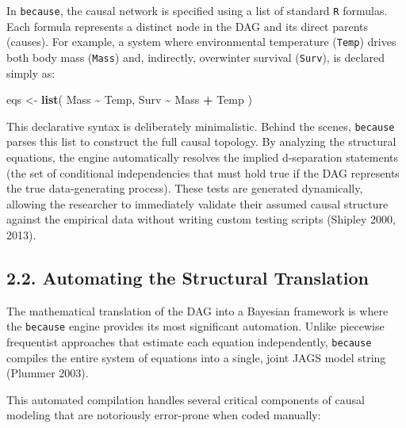 \documentclass[
]{article}
\newenvironment{Shaded}{\begin{snugshade}}{\end{snugshade}}
\newcommand{\FunctionTok}[1]{\textcolor[rgb]{0.13,0.29,0.53}{\textbf{#1}}}
\newcommand{\NormalTok}[1]{#1}
\newcommand{\OtherTok}[1]{\textcolor[rgb]{0.56,0.35,0.01}{#1}}
\newcommand{\SpecialCharTok}[1]{\textcolor[rgb]{0.81,0.36,0.00}{\textbf{#1}}}
\begin{document}
In \texttt{because}, the causal network is specified using a list of standard \texttt{R} formulas. Each formula represents a distinct node in the DAG and its direct parents (causes). For example, a system where environmental temperature (\texttt{Temp}) drives both body mass (\texttt{Mass}) and, indirectly, overwinter survival (\texttt{Surv}), is declared simply as:

\begin{Shaded}
\begin{Highlighting}[]
\NormalTok{eqs }\OtherTok{\textless{}{-}} \FunctionTok{list}\NormalTok{(}
\NormalTok{  Mass }\SpecialCharTok{\textasciitilde{}}\NormalTok{ Temp,}
\NormalTok{  Surv }\SpecialCharTok{\textasciitilde{}}\NormalTok{ Mass }\SpecialCharTok{+}\NormalTok{ Temp}
\NormalTok{)}
\end{Highlighting}
\end{Shaded}

This declarative syntax is deliberately minimalistic. Behind the scenes, \texttt{because} parses this list to construct the full causal topology. By analyzing the structural equations, the engine automatically resolves the implied d-separation statements (the set of conditional independencies that must hold true if the DAG represents the true data-generating process). These tests are generated dynamically, allowing the researcher to immediately validate their assumed causal structure against the empirical data without writing custom testing scripts (Shipley 2000, 2013).

\subsection{2.2. Automating the Structural Translation}\label{automating-the-structural-translation}

The mathematical translation of the DAG into a Bayesian framework is where the \texttt{because} engine provides its most significant automation. Unlike piecewise frequentist approaches that estimate each equation independently, \texttt{because} compiles the entire system of equations into a single, joint JAGS model string (Plummer 2003).

This automated compilation handles several critical components of causal modeling that are notoriously error-prone when coded manually:
\end{document}
